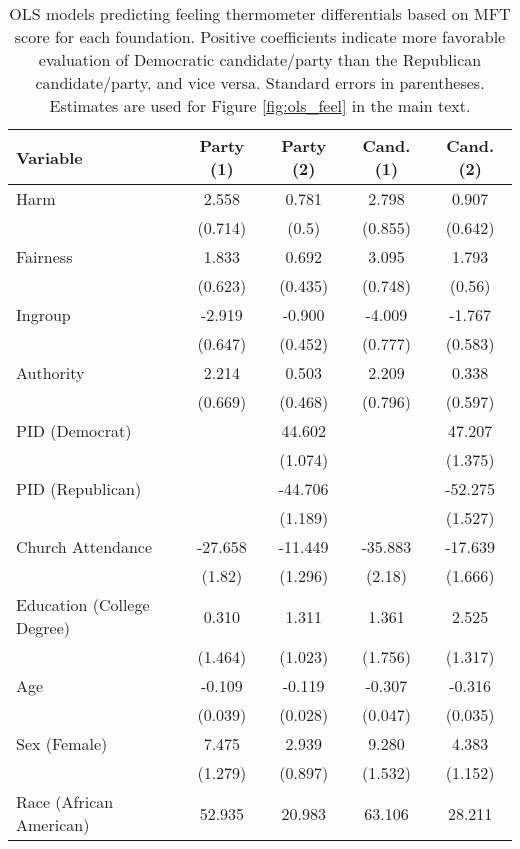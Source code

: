 \begin{table}[h]
\centering
\caption{OLS models predicting feeling thermometer differentials based on
           MFT score for each foundation. Positive coefficients indicate more favorable evaluation 
           of Democratic candidate/party than the Republican candidate/party, and vice versa. 
           Standard errors in parentheses. Estimates are used for Figure \ref{fig:ols_feel} 
           in the main text.} 
\label{tab:ols_feel}
\begingroup\footnotesize
\begin{tabular}{lcccc}
  \hline
Variable & Party (1) & Party (2) & Cand. (1) & Cand. (2) \\ 
  \hline
Harm &   2.558 &   0.781 &   2.798 &   0.907 \\ 
   & (0.714) & (0.5) & (0.855) & (0.642) \\ 
  Fairness &   1.833 &   0.692 &   3.095 &   1.793 \\ 
   & (0.623) & (0.435) & (0.748) & (0.56) \\ 
  Ingroup &  -2.919 &  -0.900 &  -4.009 &  -1.767 \\ 
   & (0.647) & (0.452) & (0.777) & (0.583) \\ 
  Authority &   2.214 &   0.503 &   2.209 &   0.338 \\ 
   & (0.669) & (0.468) & (0.796) & (0.597) \\ 
  PID (Democrat) &  &  44.602 &  &  47.207 \\ 
   &  & (1.074) &  & (1.375) \\ 
  PID (Republican) &  & -44.706 &  & -52.275 \\ 
   &  & (1.189) &  & (1.527) \\ 
  Church Attendance & -27.658 & -11.449 & -35.883 & -17.639 \\ 
   & (1.82) & (1.296) & (2.18) & (1.666) \\ 
  Education (College Degree) &   0.310 &   1.311 &   1.361 &   2.525 \\ 
   & (1.464) & (1.023) & (1.756) & (1.317) \\ 
  Age &  -0.109 &  -0.119 &  -0.307 &  -0.316 \\ 
   & (0.039) & (0.028) & (0.047) & (0.035) \\ 
  Sex (Female) &   7.475 &   2.939 &   9.280 &   4.383 \\ 
   & (1.279) & (0.897) & (1.532) & (1.152) \\ 
  Race (African American) &  52.935 &  20.983 &  63.106 &  28.211 \\ 

\end{tabular}
\end{table}
